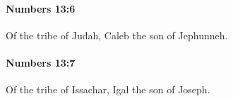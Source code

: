 		\paragraph{Numbers 13:6} %
			\label{NUMBERS-13-6}

			Of the tribe of Judah, Caleb the son of Jephunneh.


		\paragraph{Numbers 13:7} %
			\label{NUMBERS-13-7}

			Of the tribe of Issachar, Igal the son of Joseph.



